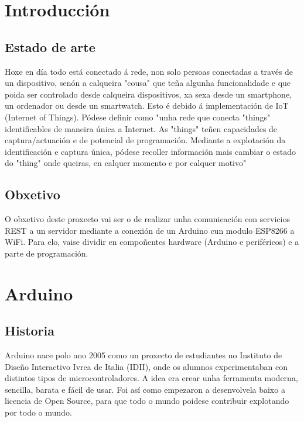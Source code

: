 \documentclass[11pt,twoside]{book}
\begin{document}
\cleardoublepage%

\chapter{Introducción}

\section{Estado de arte}

Hoxe en día todo está conectado á rede, non solo persoas conectadas a través de un dispositivo, senón a calqueira "cousa" que teña algunha funcionalidade e que poida ser controlado desde calqueira dispositivos, xa sexa desde un smartphone, un ordenador ou desde un smartwatch. Esto é debido á implementación de IoT (Internet of Things). Pódese definir como "unha rede que conecta "things" identificables de maneira única a Internet. As "things" teñen capacidades de captura/actuación e de potencial de programación. Mediante a explotación  da identificación e captura única, pódese recoller información mais cambiar o estado do "thing" onde queiras, en calquer momento e por calquer motivo" \cite{IoT}

\section{Obxetivo}

O obxetivo deste proxecto vai ser o de realizar unha comunicación con servicios REST a un servidor mediante a conexión de un Arduino cun modulo ESP8266 a WiFi. Para elo, vaise dividir en compoñentes hardware (Arduino e periféricos) e a parte de programación.



\chapter{Arduino}

\section{Historia}

Arduino nace polo ano 2005 como un proxecto de estudiantes no Instituto de Diseño Interactivo Ivrea de Italia (IDII), onde os alumnos experimentaban con distintos tipos de microcontroladores. A idea era crear unha ferramenta moderna, sencilla, barata e fácil de usar. Foi así como empezaron a desenvolvela baixo a licencia de Open Source, para que todo o mundo poidese contribuir explotando por todo o mundo.
\end{document}
